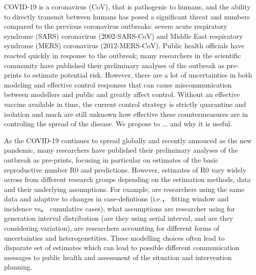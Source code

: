 COVID-19 is a coronavirus (CoV), that is pathogenic to humans, and the ability to directly transmit between humans has posed a significant threat and numbers compared to the previous coronavirus outbreaks: severe acute respiratory syndrome (SARS) coronavirus (2002-SARS-CoV) and Middle East respiratory syndrome (MERS) coronavirus (2012-MERS-CoV). 
Public health officials have reacted quickly in response to the outbreak; many researchers in the scientific community have published their preliminary analyses of the outbreak as pre-prints to estimate potential risk. 
However, there are a lot of uncertainties in both modeling and effective control responses that can cause miscommunication between modellers and public and greatly affect control.   
Without an effective vaccine available in time, the current control strategy is strictly quarantine and isolation and much are still unknown how effective these countermeasures are in controling the spread of the disease.  
We propose to ... and why it is useful. 









As the COVID-19 continues to spread globally and recently annouced as the new pandemic, many researchers have published their preliminary analyses of the outbreak as pre-prints, focusing in particular on estimates of the basic reproductive number R0 and predictions.
However, estimates of R0 vary widely across from different research groups depending on the estimation methods, data and their underlying assumptions.
For example, are researchers using the same data and adaptive to changes in case-defintions (i.e.， fitting window and incidence vs。 cumulative cases), what assumptions are researcher using for generation interval distribution (are they using serial interval, and are they considering variation), are researchers accounting for different forms of uncertainties and heterogenetities.
These modelling choices often lead to disparate set of estimates which can lead to possible different communication messages to public health and assessment of the situation and intervention planning.

